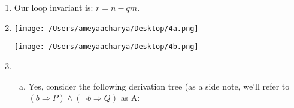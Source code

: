 \documentclass[10pt, oneside]{article}
\begin{document}
\begin{enumerate}[1.]
\begin{enumerate} [(a)]
   
   {\bf Denotation of}   ($\texttt{if} (x = x+1) \hspace{1mm} \texttt{then} \hspace{1mm} x := 0$):
       \begin{eqnarray*}  \mathcal{C} \llbracket \texttt{if} (x = x+1) \hspace{1mm} \texttt{then}\hspace{1mm} x := 0 \rrbracket & = & \{ (\sigma, \sigma) \mid (\sigma, \texttt{false}) \in \mathcal{B} \llbracket x = x + 1 \rrbracket \} \cup \{ (\sigma, \sigma') \mid (\sigma, \texttt{true}) \in \mathcal{B}\\  \llbracket x = x + 1 \rrbracket \wedge (\sigma, \sigma') \in \mathcal{C}\llbracket x := 0 \rrbracket \} \\
    \mathcal{A} \llbracket x \rrbracket & = & \{ (\sigma, \sigma)\} \\
     \mathcal{C} \llbracket x := x \rrbracket & = & \{ (\sigma, \sigma[x \mapsto \sigma(x)]) \}\\
     & = & \{(\sigma, \sigma)\}
   \end{eqnarray*}
   
   The two are the same.

  \end{enumerate}

  \item Our loop invariant is: $r = n - qm.$

\pagebreak

    \item     \hspace{4mm}
    
    \texttt{[image: /Users/ameyaacharya/Desktop/4a.png]}
    
    \texttt{[image: /Users/ameyaacharya/Desktop/4b.png]}


  \item
  \begin{enumerate} [(a)]
    \item
      Yes, consider the following derivation tree (as a side note, we'll refer to 
  		$(b \Rightarrow P) \wedge (\neg b \Rightarrow Q)$ as A:
      
      \begin{prooftree}
        

\end{prooftree}
\end{enumerate}
\end{enumerate}
\end{document}

